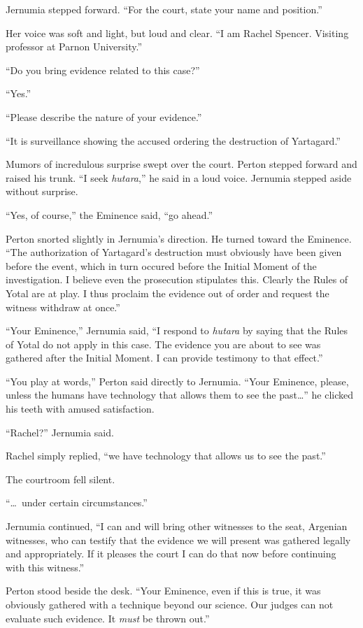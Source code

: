 Jernumia stepped forward. ``For the court, state your name and position.''

Her voice was soft and light, but loud and clear. ``I am Rachel Spencer. Visiting professor at
Parnon University.''

``Do you bring evidence related to this case?''

``Yes.''

``Please describe the nature of your evidence.''

``It is surveillance showing the accused ordering the destruction of Yartagard.''

Mumors of incredulous surprise swept over the court. Perton stepped forward and raised his
trunk. ``I seek \textit{hutara},'' he said in a loud voice. Jernumia stepped aside without
surprise.

``Yes, of course,'' the Eminence said, ``go ahead.''

Perton snorted slightly in Jernumia's direction. He turned toward the Eminence. ``The
authorization of Yartagard's destruction must obviously have been given before the event, which
in turn occured before the Initial Moment of the investigation. I believe even the prosecution
stipulates this. Clearly the Rules of Yotal are at play. I thus proclaim the evidence out of
order and request the witness withdraw at once.''

``Your Eminence,'' Jernumia said, ``I respond to \textit{hutara} by saying that the Rules of
Yotal do not apply in this case. The evidence you are about to see was gathered after the
Initial Moment. I can provide testimony to that effect.''

``You play at words,'' Perton said directly to Jernumia. ``Your Eminence, please, unless the
humans have technology that allows them to see the past\ldots'' he clicked his teeth with amused
satisfaction.

``Rachel?'' Jernumia said.

Rachel simply replied, ``we have technology that allows us to see the past.''

The courtroom fell silent.

``\ldots\ under certain circumstances.''

Jernumia continued, ``I can and will bring other witnesses to the seat, Argenian witnesses, who
can testify that the evidence we will present was gathered legally and appropriately. If it
pleases the court I can do that now before continuing with this witness.''

Perton stood beside the desk. ``Your Eminence, even if this is true, it was obviously gathered
with a technique beyond our science. Our judges can not evaluate such evidence. It \emph{must}
be thrown out.''

